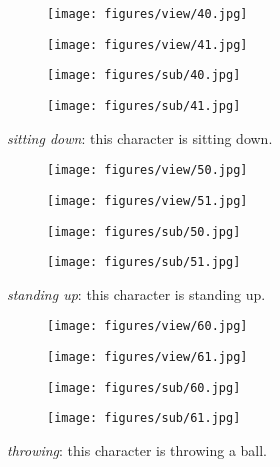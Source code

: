 \documentclass[runningheads]{llncs}
\begin{document}
\begin{figure}[h!]
  \centering
  \begin{subfigure}{0.99\textwidth}
    \texttt{[image: figures/view/40.jpg]}
\end{subfigure}
  \begin{subfigure}{0.99\textwidth}
    \texttt{[image: figures/view/41.jpg]}
\end{subfigure}
  \begin{subfigure}{0.99\textwidth}
    \texttt{[image: figures/sub/40.jpg]}
\end{subfigure}
  \begin{subfigure}{0.99\textwidth}
    \texttt{[image: figures/sub/41.jpg]}
\end{subfigure}
  \caption{\textit{sitting down}: this character is sitting down.}
  \label{fig:ntu_4}
\end{figure}



\begin{figure}[h!]
  \centering
  \begin{subfigure}{0.99\textwidth}
    \texttt{[image: figures/view/50.jpg]}
\end{subfigure}
  \begin{subfigure}{0.99\textwidth}
    \texttt{[image: figures/view/51.jpg]}
\end{subfigure}
  \begin{subfigure}{0.99\textwidth}
    \texttt{[image: figures/sub/50.jpg]}
\end{subfigure}
  \begin{subfigure}{0.99\textwidth}
    \texttt{[image: figures/sub/51.jpg]}
\end{subfigure}
  \caption{\textit{standing up}: this character is standing up.}
  \label{fig:ntu_5}
\end{figure}



\begin{figure}[h!]
  \centering
  \begin{subfigure}{0.99\textwidth}
    \texttt{[image: figures/view/60.jpg]}
\end{subfigure}
  \begin{subfigure}{0.99\textwidth}
    \texttt{[image: figures/view/61.jpg]}
\end{subfigure}
  \begin{subfigure}{0.99\textwidth}
    \texttt{[image: figures/sub/60.jpg]}
\end{subfigure}
  \begin{subfigure}{0.99\textwidth}
    \texttt{[image: figures/sub/61.jpg]}
\end{subfigure}
  \caption{\textit{throwing}: this character is throwing a ball.}
  \label{fig:ntu_6}
\end{figure}
\end{document}
